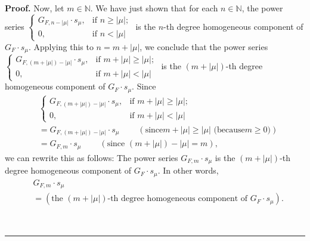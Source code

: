 \documentclass[numbers=enddot,12pt,final,onecolumn,notitlepage]{scrartcl}%
\theoremstyle{definition}
\newenvironment{proof}[1][Proof]{\noindent\textbf{#1.} }{\ \rule{0.5em}{0.5em}}
\newenvironment{verlong}{}{}
\begin{document}
\begin{verlong}
\begin{proof}
Now, let $m\in\mathbb{N}$. We have just shown that for each $n\in\mathbb{N}$,
the power series $%
\begin{cases}
G_{F,n-\left\vert \mu\right\vert }\cdot s_{\mu}, & \text{if }n\geq\left\vert
\mu\right\vert ;\\
0, & \text{if }n<\left\vert \mu\right\vert
\end{cases}
$ is the $n$-th degree homogeneous component of $G_{F}\cdot s_{\mu}$. Applying
this to $n=m+\left\vert \mu\right\vert $, we conclude that the power series
\newline$%
\begin{cases}
G_{F,\left(  m+\left\vert \mu\right\vert \right)  -\left\vert \mu\right\vert
}\cdot s_{\mu}, & \text{if }m+\left\vert \mu\right\vert \geq\left\vert
\mu\right\vert ;\\
0, & \text{if }m+\left\vert \mu\right\vert <\left\vert \mu\right\vert
\end{cases}
$ is the $\left(  m+\left\vert \mu\right\vert \right)  $-th degree homogeneous
component of $G_{F}\cdot s_{\mu}$. Since%
\begin{align*}
&
\begin{cases}
G_{F,\left(  m+\left\vert \mu\right\vert \right)  -\left\vert \mu\right\vert
}\cdot s_{\mu}, & \text{if }m+\left\vert \mu\right\vert \geq\left\vert
\mu\right\vert ;\\
0, & \text{if }m+\left\vert \mu\right\vert <\left\vert \mu\right\vert
\end{cases}
\\
&  =G_{F,\left(  m+\left\vert \mu\right\vert \right)  -\left\vert
\mu\right\vert }\cdot s_{\mu}\ \ \ \ \ \ \ \ \ \ \left(  \text{since
}m+\left\vert \mu\right\vert \geq\left\vert \mu\right\vert \text{ (because
}m\geq0\text{)}\right) \\
&  =G_{F,m}\cdot s_{\mu}\ \ \ \ \ \ \ \ \ \ \left(  \text{since }\left(
m+\left\vert \mu\right\vert \right)  -\left\vert \mu\right\vert =m\right)  ,
\end{align*}
we can rewrite this as follows: The power series $G_{F,m}\cdot s_{\mu}$ is the
$\left(  m+\left\vert \mu\right\vert \right)  $-th degree homogeneous
component of $G_{F}\cdot s_{\mu}$. In other words,%
\begin{align}
&  G_{F,m}\cdot s_{\mu}\nonumber\\
&  =\left(  \text{the }\left(  m+\left\vert \mu\right\vert \right)  \text{-th
degree homogeneous component of }G_{F}\cdot s_{\mu}\right)  .
\label{pf.cor.GFm.pieri.left}%
\end{align}



\end{proof}
\end{verlong}
\end{document}
